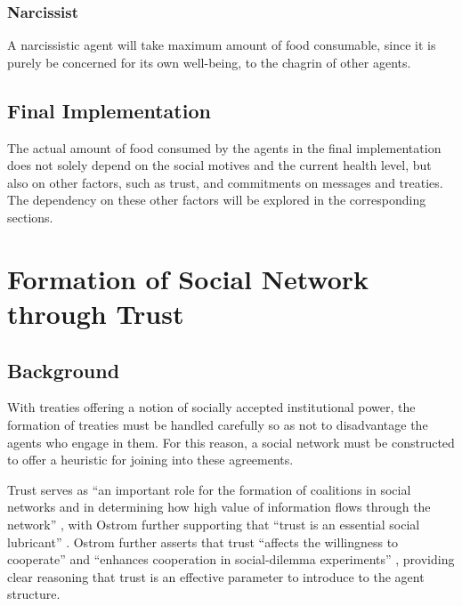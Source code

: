 \subsubsection{Narcissist}

A narcissistic agent will take maximum amount of food consumable, since it is purely be concerned for its own well-being, to the chagrin of other agents.


\subsection{Final Implementation}
The actual amount of food consumed by the agents in the final implementation does not solely depend on the social motives and the current health level, but also on other factors, such as trust, and commitments on messages and treaties. The dependency on these other factors will be explored in the corresponding sections.


\section{Formation of Social Network through Trust}\label{trust}

\subsection{Background}

With treaties offering a notion of socially accepted institutional power, the formation of treaties must be handled carefully so as not to disadvantage the agents who engage in them. For this reason, a social network must be constructed to offer a heuristic for joining into these agreements. 

Trust serves as ``an important role for the formation of coalitions in social networks and in determining how high value of information flows through the network'' \cite{trustEEE}, with Ostrom further supporting that ``trust is an essential social lubricant'' \cite{ostrom2003trust}. Ostrom further asserts that trust ``affects the willingness to cooperate'' \cite{ostrom2003trust} and ``enhances cooperation in social-dilemma experiments'' \cite{ostrom2003trust}, providing clear reasoning that trust is an effective parameter to introduce to the agent structure.

